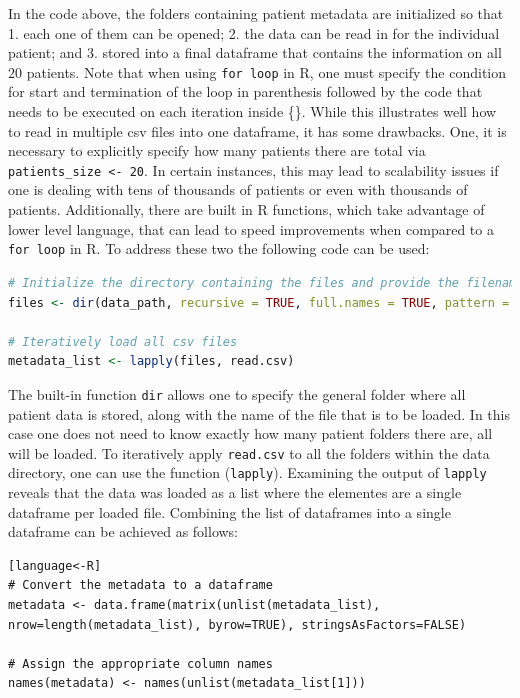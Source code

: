 In the code above, the folders containing patient metadata are initialized so that 1. each one of them can be opened; 2. the data can be read in for the individual patient; and 3. stored into a final dataframe that contains the information on all $20$ patients. Note that when using \verb|for loop| in R, one must specify the condition for start and termination of the loop in parenthesis followed by the code that needs to be executed on each iteration inside \{\}.
While this illustrates well how to read in multiple csv files into one dataframe, it has some drawbacks. One, it is necessary to explicitly specify how many patients there are total via \verb|patients_size <- 20|. In certain instances, this may lead to scalability issues if one is dealing with tens of thousands of patients or even with thousands of patients. Additionally, there are built in R functions, which take advantage of lower level language, that can lead to speed improvements when compared to a \verb|for loop| in R.
To address these two the following code can be used:
\begin{lstlisting}[language=R]
# Initialize the directory containing the files and provide the filenames within each folder
files <- dir(data_path, recursive = TRUE, full.names = TRUE, pattern = "metadata.csv$")

# Iteratively load all csv files
metadata_list <- lapply(files, read.csv)
\end{lstlisting}
The built-in function \verb|dir| allows one to specify the general folder where all patient data is stored, along with the name of the file that is to be loaded. In this case one does not need to know exactly how many patient folders there are, all will be loaded. To iteratively apply \verb|read.csv| to all the folders within the data directory, one can use the function (\verb|lapply|).
Examining the output of \verb|lapply| reveals that the data was loaded as a list where the elementes are a single dataframe per loaded file. Combining the list of dataframes into a single dataframe can be achieved as follows:
\begin{lstlisting}[language<-R]
# Convert the metadata to a dataframe
metadata <- data.frame(matrix(unlist(metadata_list), nrow=length(metadata_list), byrow=TRUE), stringsAsFactors=FALSE)

# Assign the appropriate column names
names(metadata) <- names(unlist(metadata_list[1]))
\end{lstlisting}

